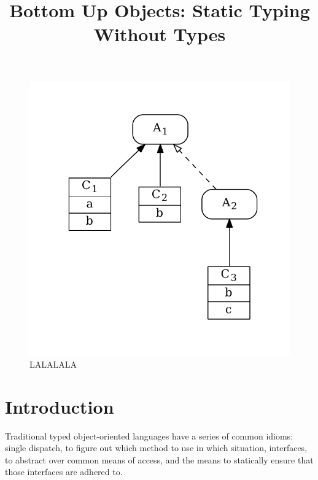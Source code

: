 \documentclass[preprint]{sigplanconf}
\begin{document}
\title{Bottom Up Objects: Static Typing Without Types} 
\maketitle

\begin{figure}
\centering
\includegraphics[scale=.6]{example2.pdf}
\caption{LALALALA}
\label{fig:algo}
\end{figure}

\section{Introduction}

Traditional typed object-oriented languages have a series of
common idioms: single dispatch, to figure out which method
to use in which situation, interfaces, to abstract over 
common means of access, and the means to statically
ensure that those interfaces are adhered to.
\end{document}
